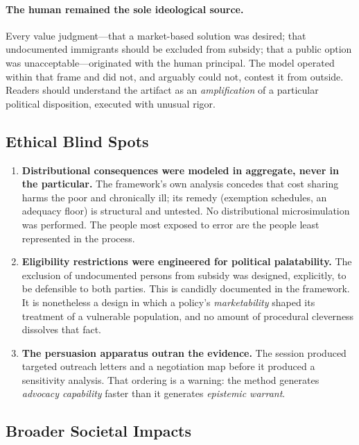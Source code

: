 \documentclass[11pt,a4paper]{article}
\begin{document}
\paragraph{The human remained the sole ideological source.} Every value judgment---that a market-based solution was desired; that undocumented immigrants should be excluded from subsidy; that a public option was unacceptable---originated with the human principal. The model operated within that frame and did not, and arguably could not, contest it from outside. Readers should understand the artifact as an \emph{amplification} of a particular political disposition, executed with unusual rigor.

\subsection{Ethical Blind Spots}

\begin{enumerate}[leftmargin=*,itemsep=4pt]
  \item \textbf{Distributional consequences were modeled in aggregate, never in the particular.} The framework's own analysis concedes that cost sharing harms the poor and chronically ill; its remedy (exemption schedules, an adequacy floor) is structural and untested. No distributional microsimulation was performed. The people most exposed to error are the people least represented in the process.
  \item \textbf{Eligibility restrictions were engineered for political palatability.} The exclusion of undocumented persons from subsidy was designed, explicitly, to be defensible to both parties. This is candidly documented in the framework. It is nonetheless a design in which a policy's \emph{marketability} shaped its treatment of a vulnerable population, and no amount of procedural cleverness dissolves that fact.
  \item \textbf{The persuasion apparatus outran the evidence.} The session produced targeted outreach letters and a negotiation map before it produced a sensitivity analysis. That ordering is a warning: the method generates \emph{advocacy capability} faster than it generates \emph{epistemic warrant}.
\end{enumerate}

\subsection{Broader Societal Impacts}
\end{document}
